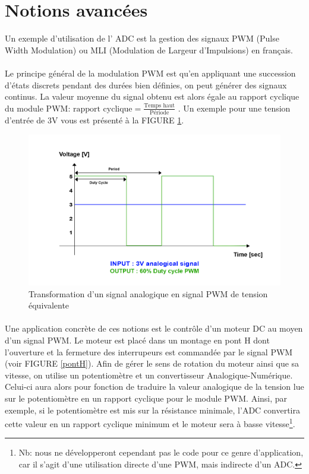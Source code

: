 \section{Notions avancées}
\label{notion}
Un exemple d'utilisation de l' ADC est la gestion des signaux PWM (Pulse Width Modulation) ou  MLI (Modulation de Largeur d'Impulsions) en français. 
\paragraph{}
Le principe général de la modulation PWM est qu'en appliquant une succession d'états discrets pendant des durées bien définies, on peut générer des signaux continus. La valeur moyenne du signal obtenu est alors égale au rapport cyclique du module PWM:   $\text {rapport cyclique} =  \frac{\text{Temps haut}}{\text{Période}}$ . Un exemple pour une tension d'entrée de 3V vous est présenté à la FIGURE \ref{pwm}.



\begin{figure}[h]
\begin{center}
\begin{framed}
\includegraphics[scale=0.8]{images/pwm.png}
\caption{Transformation d'un signal analogique en signal PWM de tension équivalente}
\label{pwm}
\end{framed}
\end{center}
\end{figure}

\paragraph{}
Une application concrète de ces notions est le contrôle d'un moteur DC au moyen d'un signal PWM. Le moteur est placé dans un montage en pont H dont l'ouverture et la fermeture des interrupeurs est commandée par le signal PWM (voir FIGURE \ref{pontH}). Afin de gérer le sens de rotation du moteur ainsi que sa vitesse, on utilise un potentiomètre et un convertisseur Analogique-Numérique. Celui-ci aura alors pour fonction de traduire la valeur analogique de la tension lue sur le potentiomètre en un rapport cyclique pour le module PWM. Ainsi, par exemple,  si le potentiomètre est mis sur la résistance minimale, l'ADC convertira cette valeur en un rapport cyclique minimum et le moteur sera à basse vitesse\footnote{Nb: nous ne développeront cependant pas le code pour ce genre d'application, car il s'agit d'une utilisation directe d'une PWM, mais indirecte d'un ADC.}.

